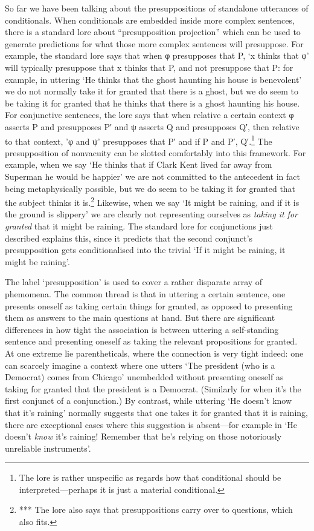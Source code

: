 So far we have been talking about the presuppositions of standalone
utterances of conditionals. When conditionals are embedded inside more
complex sentences, there is a standard lore about ``presupposition
projection'' which can be used to generate predictions for what those
more complex sentences will presuppose. For example, the standard lore
says that when φ presupposes that P, `x thinks that φ' will typically
presuppose that x thinks that P, and not presuppose that P: for example,
in uttering `He thinks that the ghost haunting his house is benevolent'
we do not normally take it for granted that there is a ghost, but we do
seem to be taking it for granted that he thinks that there is a ghost
haunting his house. For conjunctive sentences, the lore says that when
relative a certain context φ asserts P and presupposes P′ and ψ asserts
Q and presupposes Q′, then relative to that context, 'φ and ψ'
presupposes that P′ and if P and P′, Q′.\footnote{The lore is rather
  unspecific as regards how that conditional should be
  interpreted---perhaps it is just a material conditional.} The
presupposition of nonvacuity can be slotted comfortably into this
framework. For example, when we say `He thinks that if Clark Kent lived
far away from Superman he would be happier' we are not committed to the
antecedent in fact being metaphysically possible, but we do seem to be
taking it for granted that the subject thinks it is.\footnote{*** The
  lore also says that presuppositions carry over to questions, which
  also fits.} Likewise, when we say `It might be raining, and if it is
the ground is slippery' we are clearly not representing ourselves as
\emph{taking it for granted} that it might be raining. The standard lore
for conjunctions just described explains this, since it predicts that
the second conjunct's presupposition gets conditionalised into the
trivial `If it might be raining, it might be raining'.

The label `presupposition' is used to cover a rather disparate array of
phemomena. The common thread is that in uttering a certain sentence, one
presents oneself as taking certain things for granted, as opposed to
presenting them as answers to the main questions at hand. But there are
significant differences in how tight the association is between uttering
a self-standing sentence and presenting oneself as taking the relevant
propositions for granted. At one extreme lie parentheticals, where the
connection is very tight indeed: one can scarcely imagine a context
where one utters `The president (who is a Democrat) comes from Chicago'
unembedded without presenting oneself as taking for granted that the
president is a Democrat. (Similarly for when it's the first conjunct of
a conjunction.) By contrast, while uttering `He doesn't know that it's
raining' normally suggests that one takes it for granted that it is
raining, there are exceptional cases where this suggestion is
absent---for example in `He doesn't \emph{know} it's raining! Remember
that he's relying on those notoriously unreliable instruments'.

